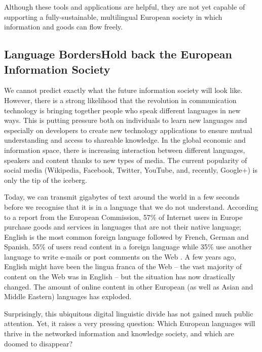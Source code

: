 \documentclass[]{../../metanetpaper}
\begin{document}
\begin{multicols}{2}
Although these tools and applications are helpful, they are not yet capable of supporting a fully-sustainable, multilingual European society in which information and goods can flow freely.

\subsection[Language Borders Hold back the European Information Society]{Language Borders\newline Hold back the European Information Society}

We cannot predict exactly what the future information society will look like. However, there is a strong likelihood that the revolution in communication technology is bringing together people who speak different languages in new ways. This is putting pressure both on individuals to learn new languages and especially on developers to create new technology applications to ensure mutual understanding and access to shareable knowledge. In the global economic and information space, there is increasing interaction between different languages, speakers and content thanks to new types of media. The current popularity of social media (Wikipedia, Facebook, Twitter, YouTube, and, recently, Google+) is only the tip of the iceberg.


Today, we can transmit gigabytes of text around the world in a few seconds before we recognise that it is in a language that we do not understand. According to a report from the European Commission, 57\% of Internet users in Europe purchase goods and services in languages that are not their native language; English is the most common foreign language followed by French, German and Spanish. 55\% of users read content in a foreign language while 35\% use another language to write e-mails or post comments on the Web \cite{EC1}. A few years ago, English might have been the lingua franca of the Web -- the vast majority of content on the Web was in English -- but the situation has now drastically changed. The amount of online content in other European (as well as Asian and Middle Eastern) languages has exploded.

Surprisingly, this ubiquitous digital linguistic divide has not gained much public attention. Yet, it raises a very pressing question: Which European languages will thrive in the networked information and knowledge society, and which are doomed to disappear?


\end{multicols}
\end{document}
